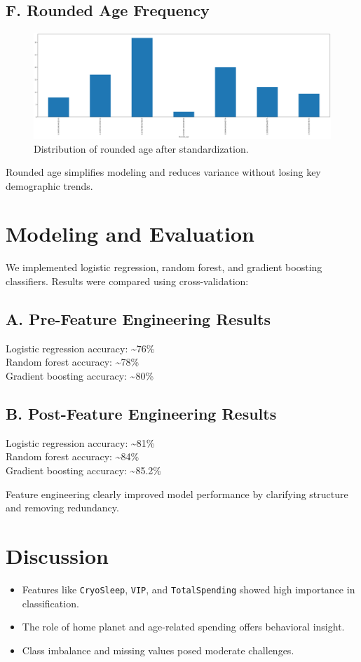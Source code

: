\documentclass[12pt]{article}
\begin{document}
\subsection*{F. Rounded Age Frequency}
\begin{figure}[H]
    \centering
    \includegraphics[width=1\linewidth]{output6.png}
    \caption{Distribution of rounded age after standardization.}
\end{figure}
\noindent
Rounded age simplifies modeling and reduces variance without losing key demographic trends.

\section{Modeling and Evaluation}
We implemented logistic regression, random forest, and gradient boosting classifiers. Results were compared using cross-validation:

\subsection*{A. Pre-Feature Engineering Results}
Logistic regression accuracy: \textasciitilde 76\% \\
Random forest accuracy: \textasciitilde 78\% \\
Gradient boosting accuracy: \textasciitilde 80\%

\subsection*{B. Post-Feature Engineering Results}
Logistic regression accuracy: \textasciitilde 81\% \\
Random forest accuracy: \textasciitilde 84\% \\
Gradient boosting accuracy: \textasciitilde 85.2\%

Feature engineering clearly improved model performance by clarifying structure and removing redundancy.

\section{Discussion}
\begin{itemize}
    \item Features like \texttt{CryoSleep}, \texttt{VIP}, and \texttt{TotalSpending} showed high importance in classification.
    \item The role of home planet and age-related spending offers behavioral insight.
    \item Class imbalance and missing values posed moderate challenges.
\end{itemize}
\end{document}
